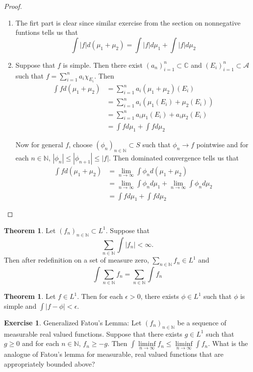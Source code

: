 \documentclass[12pt]{amsart}
\theoremstyle{definition}
\newtheorem{thm}[definition]{Theorem}
\newtheorem{ex}[definition]{Exercise}
\newcommand{\ep}{\epsilon}
\newcommand{\C}{\mathbb{C}}
\newcommand{\N}{\mathbb{N}}
\newcommand{\MA}{\mathcal{A}}
\newcommand{\limfn}{\liminf \limits_{n \rightarrow \infty}}
\newcommand{\limn}{\lim \limits_{n \rightarrow \infty}}
\newcommand{\lex}[1]{\label{ex:#1}}
\begin{document}
	\begin{proof}
		\begin{enumerate}
			\item The firt part is clear since similar exercise from the section on nonnegative funtions tells us that $$\int |f| d(\mu_1 + \mu_2) = \int |f| d \mu_1 + \int |f| d\mu_2$$
			
			
			\item Suppose that $f$ is simple. Then there exist $(a_n)_{i=1}^n \subset \C$ and $(E_i)_{i=1}^n \subset \MA$ such that $f = \sum\limits_{i =1}^n a_i \chi_{E_i}$. Then 
			\begin{align*}
				\int f d(\mu_1 + \mu_2) 
				&= \sum\limits_{i =1}^n a_i (\mu_1 + \mu_2)(E_i)\\
				&= \sum\limits_{i =1}^n a_i (\mu_1(E_i) + \mu_2(E_i))\\
				&= \sum\limits_{i =1}^n a_i \mu_1(E_i) + a_i \mu_2(E_i)\\
				&= \int f d\mu_1 + \int f d\mu_2
			\end{align*}
			
			Now for general $f$, choose $(\phi_n)_{n \in \N} \subset S$ such that $\phi_n \rightarrow f$ pointwise and for each $n \in \N$, $|\phi_n| \leq |\phi_{n+1}| \leq |f|$. Then dominated convergence tells us that 
			\begin{align*}
				\int f d(\mu_1 + \mu_2) 
				&= \limn \int \phi_n d(\mu_1 + \mu_2)\\
				&= \limn \int \phi_n d \mu_1 + \limn \int \phi_n d \mu_2 \\
				&= \int f d \mu_1 + \int f d \mu_2
			\end{align*}
			
		\end{enumerate}
	\end{proof}
	
	\begin{thm}
		Let $(f_n)_{n \in \N} \subset L^1$. Suppose that $$\sum_{n \in \N} \int |f_n| < \infty.$$ Then after redefinition on a set of measure zero, $\sum_{n \in \N}f_n \in L^1$ and $$\int \sum_{n \in \N}f_n = \sum_{n \in \N} \int f_n$$
	\end{thm}
	
	\begin{thm}
		Let $f \in L^1$. Then for each $\ep > 0$, there exists $\phi \in L^1$ such that $\phi$ is simple and $\int |f - \phi| < \ep$. 
	\end{thm}
	
	\begin{ex} \lex{00000} {Generalized Fatou's Lemma:}
		Let $(f_n)_{n \in \N}$ be a sequence of measurable real valued functions. Suppose that there exists $g \in L^1$ such that $g \geq 0$ and for each $n \in \N$, $f_n \geq -g$. Then $ \int \limfn f_n \leq \limfn \int f_n$. What is the analogue of Fatou's lemma for measurable, real valued functions that are appropriately bounded above?  
	\end{ex}
	
\end{document}
